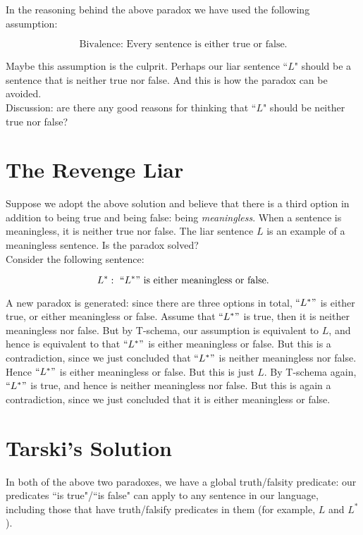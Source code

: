 \documentclass[11pt]{article}
\theoremstyle{definition}
\begin{document}
In the reasoning behind the above paradox we have used the following assumption:

$$\text{Bivalence: Every sentence is either true or false.}$$

\noindent
Maybe this assumption is the culprit. Perhaps our liar sentence ``$L$" should be a sentence that is neither true nor false. And this is how the paradox can be avoided. \\

\noindent
Discussion: are there any good reasons for thinking that ``$L$" should be neither true nor false?

\section{The Revenge Liar}

Suppose we adopt the above solution and believe that there is a third option in addition to being true and being false: being \textit{meaningless}. When a sentence is meaningless, it is neither true nor false. The liar sentence $L$ is an example of a meaningless sentence. Is the paradox solved? \\

\noindent
Consider the following sentence:


$$ L^*: \, \, ``L^*" \, \, \text{is either meaningless or false}.$$

\noindent
A new paradox is generated: since there are three options in total, $``L^*"$ is either true, or either meaningless or false. Assume that $``L^*"$ is true, then it is neither meaningless nor false. But by T-schema, our assumption is equivalent to $L$, and hence is equivalent to that $``L^*"$ is either meaningless or false. But this is a contradiction, since we just concluded that $``L^*"$ is neither meaningless nor false. Hence $``L^*"$ is either meaningless or false. But this is just $L$. By T-schema again, $``L^*"$ is true, and hence is neither meaningless nor false. But this is again a contradiction, since we just concluded that it is either meaningless or false.


\section{Tarski's Solution}

In both of the above two paradoxes, we have a global truth/falsity predicate: our predicates ``is true"/``is false" can apply to any sentence in our language, including those that have truth/falsify predicates in them (for example, $L$ and $L^*$). \\
\end{document}
